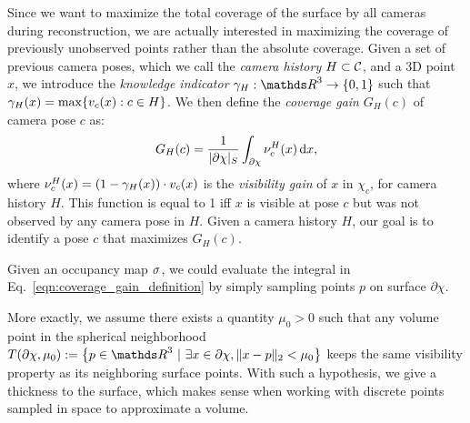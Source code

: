 Since we want to maximize the total coverage of the surface by all cameras during reconstruction, we are actually interested in maximizing the coverage of previously unobserved points rather than the absolute coverage.  Given a set of previous camera poses, which we call the \textit{camera history} $H\subset {\cal C}$, and a 3D point $x$, we introduce the \textit{knowledge indicator} $\gamma_H:\IR^3 \rightarrow \{0, 1\}$ such that $\gamma_H(x)=\max\{v_c(x):c\in H\}$. We then define the \textit{coverage gain} $G_H(c)$ of camera pose $c$ as:
%
\begin{equation}
    \label{eqn:coverage_gain_definition}
    G_H(c) = \frac{1}{|\partial\chi|_S} \int_{\partial\chi} \nu^H_c(x)\,\text{d}x,
\end{equation}
%
where $\nu^H_c(x) = (1-\gamma_H(x)) \cdot v_c(x)$ is the \textit{visibility gain} of $x$ in $\chi_c$, for camera history $H$. This function is equal to 1 iff $x$ is visible at pose $c$ but was not observed by any camera pose in $H$. Given a camera history $H$, our goal is to identify a pose $c$ that maximizes $G_H(c)$.

Given an occupancy map $\sigma$, we could evaluate the integral in Eq.~\eqref{eqn:coverage_gain_definition} by simply sampling points $p$ on surface $\partial\chi$. 

More exactly, we assume there exists a quantity $\mu_0 > 0$ such that any volume point in the spherical neighborhood $T(\partial\chi, \mu_0) := \left\{ p \in \IR^3 \ | \ \exists x \in \partial\chi, \|x-p\|_2 < \mu_0 \right\}$ keeps the same visibility property as its neighboring surface points. With such a hypothesis, we give a thickness to the surface, which makes sense when working with discrete points sampled in space to approximate a volume.


